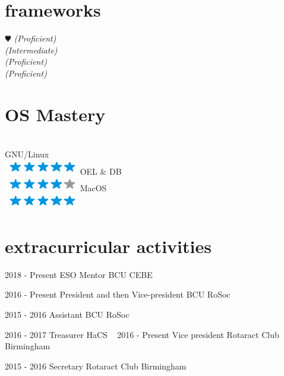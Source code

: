 \documentclass[]{friggeri-cv}
\begin{document}
\begin{aside2}
  \section{frameworks}
    {\color{red} $\varheartsuit$} 
     \emph{(Proficient)} \\
     \emph{(Intermediate)} \\
    \emph{(Proficient)} \\
    \emph{(Proficient)} \\
    
  \section{OS Mastery}
  \\GNU/Linux  \\\includegraphics[scale=0.30]{img/5stars.png}
  OEL \& DB \\\includegraphics[scale=0.30]{img/4stars.png}
  MacOS  \\\includegraphics[scale=0.30]{img/5stars.png}
\end{aside2}


\section{extracurricular activities}
\begin{entrylist}
    
    
    \entry
    {2018 - Present}
    {ESO Mentor}
    {BCU CEBE}
    
    \entry
    {2016 - Present}
    {President and then Vice-president}
    {BCU RoSoc}
    
    \entry
    {2015 - 2016}
    {Assistant}
    {BCU RoSoc}
    
     \entry
    {2016 - 2017}
    {Treasurer}
    {HaCS}
    ~ 
     \entry
    {2016 - Present}
    {Vice president}
    {Rotaract Club Birmingham}
    
    \entry
    {2015 - 2016}
    {Secretary}
    {Rotaract Club Birmingham}
    ~
    
\end{entrylist}
\end{document}
